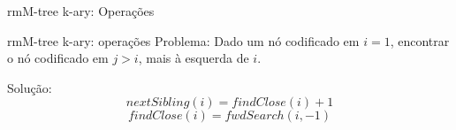 \begin{frame}{rmM-tree k-ary: Operações}
    \begin{table}
        \centering
        \caption[Operações sobre a rmM-tree binária e k-ária]{Operações suportadas pela rmM-tree binária e rmM-tree-kária}
    \end{table}
\end{frame}


\begin{frame}{rmM-tree k-ary: operações}
    Problema: Dado um nó codificado em $i=1$, encontrar o nó codificado em $j>i$, mais à esquerda de $i$.

    Solução: 
    $$nextSibling(i) = findClose(i) +1$$ 
    $$findClose(i) = fwdSearch(i,-1)$$ 
 \end{frame}

